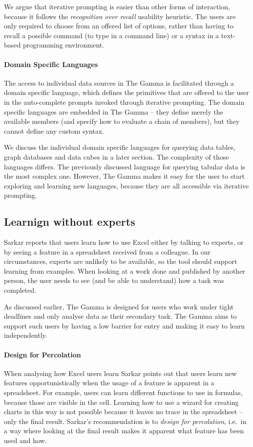 \documentclass[manuscript,review,anonymous]{acmart}
\begin{document}
We argue that iterative prompting is easier than other forms of interaction, because it
follows the \emph{recognition over recall} usability heuristic. The users are only required to
choose from an offered list of options, rather than having to recall a possible command
(to type in a command line) or a syntax in a text-based programming environment.

\paragraph{Domain Specific Languages}
The access to individual data sources in The Gamma is facilitated through a domain specific
language, which defines the primitives that are offered to the user in the auto-complete prompts
invoked through iterative prompting. The domain specific languages are embedded in The Gamma --
they define merely the available members (and specify how to evaluate a chain of members), but
they cannot define any custom syntax.

We discuss the individual domain specific languages for querying data tables, graph databases and
data cubes in a later section. The complexity of those languages differs. The previously discussed
language for querying tabular data is the most complex one. However, The Gamma makes it easy for
the user to start exploring and learning new languages, because they are all accessible via
iterative prompting.

\subsection{Learnign without experts}

Sarkar \cite{learning} reports that users learn how to use Excel either by talking to experts,
or by seeing a feature in a spreadsheet received from a colleague. In our circumstances, experts
are unlikely to be available, so the tool should support learning from examples. When looking at
a work done and published by another person, the user needs to see (and be able to understand)
how a task was completed.

As discussed earlier, The Gamma is designed for users who work under tight deadlines and only
analyse data as their secondary task. The Gamma aims to support such users by having a low
barrier for entry and making it easy to learn independently.

\paragraph{Design for Percolation}
When analysing how Excel users learn Sarkar \cite{learning} points out that users learn new
features opportunistically when the usage of a feature is apparent in a spreadsheet. For
example, users can learn different functions to use in formulas, because those are visible in
the cell. Learning how to use a wizard for creating charts in this way is not possible because
it leaves no trace in the spreadsheet -- only the final result. Sarkar's recommendation is to
\emph{design for percolation}, i.e.~in a way where looking at the final result makes it apparent
what feature has been used and how.
\end{document}
